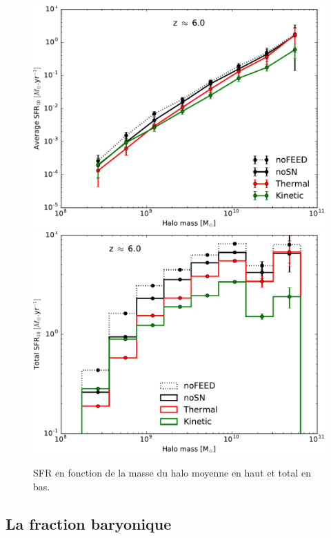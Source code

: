 \begin{figure}
		\includegraphics[width=.95\linewidth]{img/03/SFR_halo_avg.pdf}
		\includegraphics[width=.95\linewidth]{img/03/SFR_halo_tot.pdf}
        \caption[SFR en fonction de la masse du halo]{SFR en fonction de la masse du halo moyenne en haut et total en bas.
        }
 		\label{fig:sfr_halo}
\end{figure}



\subsection{La fraction baryonique}
\label{sec:baryon_frac}

